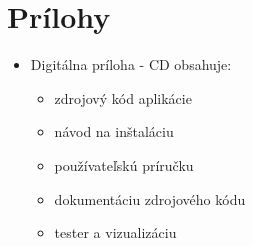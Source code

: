 \documentclass[12pt,a4paper]{report}
\theoremstyle{definition}
\theoremstyle{remark}
\begin{document}
\chapter*{Prílohy}

\begin{itemize}
\item Digitálna príloha - CD obsahuje:
	\begin{itemize}
	\item zdrojový kód aplikácie
	\item návod na inštaláciu
	\item používateľskú príručku
	\item dokumentáciu zdrojového kódu
	\item tester a vizualizáciu
	\end{itemize}
\end{itemize}
\end{document}
